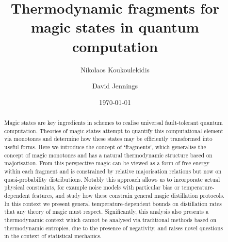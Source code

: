 \documentclass[pra,
aps,
twocolumn,
superscriptaddress,
groupedaddress,
nofootinbib,
reprint
]{revtex4-1}
\begin{document}

\begin{abstract}
\ddd{[To be sharpened]} Magic states are key ingredients in schemes to realise universal fault-tolerant quantum computation.
Theories of magic states attempt to quantify this computational element via monotones and determine how these states may be efficiently transformed into useful forms. Here we introduce the concept of `fragments', which generalise the concept of magic monotones and has a natural thermodynamic structure based on majorisation. From this perspective magic can be viewed as a form of free energy within each fragment and is constrained by relative majorisation relations but now on quasi-probability distributions. Notably this approach allows us to incorporate actual physical constraints, for example noise models with particular bias or temperature-dependent features, and study how these constrain general magic distillation protocols. In this context we present general temperature-dependent bounds on distillation rates that any theory of magic must respect. Significantly, this analysis also presents a thermodynamic context which cannot be analysed via traditional methods based on thermodynamic entropies, due to the presence of negativity, and raises novel questions in the context of statistical mechanics.
\end{abstract}


\title{Thermodynamic fragments for magic states in quantum computation}

\author{Nikolaos Koukoulekidis}
\author{David Jennings}

\date{\today}
\maketitle

\end{document}
